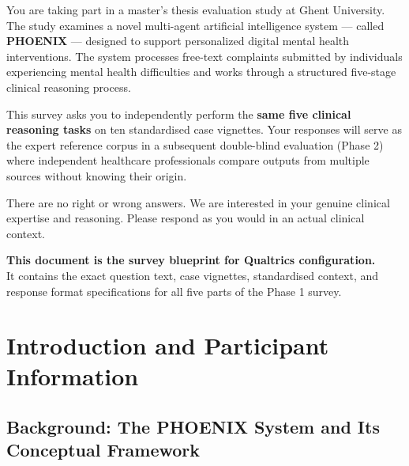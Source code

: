 \documentclass[11pt,a4paper]{article}
\begin{document}
\begin{titlepage}
\begin{tcolorbox}[
  colback=AccentBlue,colframe=PrimaryBlue,
  arc=2mm,left=10pt,right=10pt,top=9pt,bottom=9pt,
  width=0.88\textwidth
]
\medskip\small
You are taking part in a master's thesis evaluation study at Ghent University. The study examines a novel multi-agent artificial intelligence system --- called \textbf{PHOENIX} --- designed to support personalized digital mental health interventions. The system processes free-text complaints submitted by individuals experiencing mental health difficulties and works through a structured five-stage clinical reasoning process.

\medskip
This survey asks you to independently perform the \textbf{same five clinical reasoning tasks} on ten standardised case vignettes. Your responses will serve as the expert reference corpus in a subsequent double-blind evaluation (Phase 2) where independent healthcare professionals compare outputs from multiple sources without knowing their origin.

\medskip
There are no right or wrong answers. We are interested in your genuine clinical expertise and reasoning. Please respond as you would in an actual clinical context.
\end{tcolorbox}

\vfill

\begin{tcolorbox}[
  colback=SoftBG,colframe=BorderGrey,
  arc=1.5mm,left=8pt,right=8pt,top=7pt,bottom=7pt,
  width=0.82\textwidth
]
\centering\small
\textbf{This document is the survey blueprint for Qualtrics configuration.}\\
It contains the exact question text, case vignettes, standardised context, and response format specifications for all five parts of the Phase 1 survey.
\end{tcolorbox}

\vspace{0.4cm}{\large\today}
\end{titlepage}

\newpage
\tableofcontents
\newpage

\section{Introduction and Participant Information}

\subsection{Background: The PHOENIX System and Its Conceptual Framework}
\end{document}
